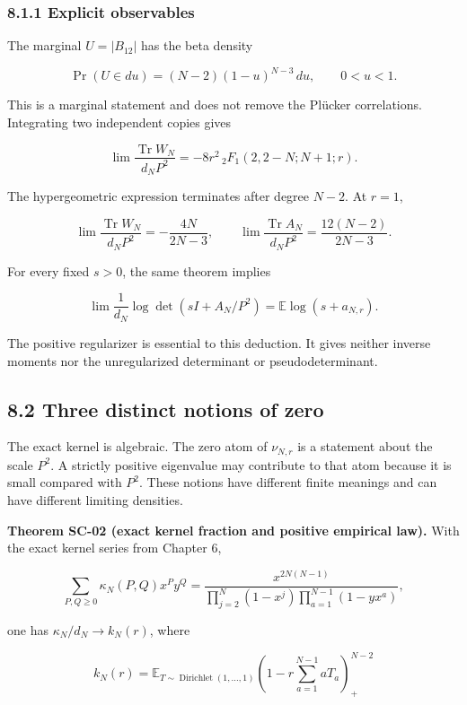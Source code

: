\documentclass[a4paper,11pt]{article}
\numberwithin{equation}{section}
\begin{document}
\hypertarget{explicit-observables}{%
\subsubsection{8.1.1 Explicit observables}\label{explicit-observables}}

The marginal \(U=|B_{12}|\) has the beta density

\[
\Pr(U\in du)=(N-2)(1-u)^{N-3}\,du,\qquad0<u<1.
\]

This is a marginal statement and does not remove the Plücker correlations. Integrating two independent copies gives

\[
\lim\frac{\operatorname{Tr}W_N}{d_NP^2}
=-8r^2\,{}_2F_1(2,2-N;N+1;r).
\]

The hypergeometric expression terminates after degree \(N-2\). At \(r=1\),

\[
\lim\frac{\operatorname{Tr}W_N}{d_NP^2}=-\frac{4N}{2N-3},\qquad
\lim\frac{\operatorname{Tr}A_N}{d_NP^2}=\frac{12(N-2)}{2N-3}.
\]

For every fixed \(s>0\), the same theorem implies

\[
\lim\frac1{d_N}\log\det(sI+A_N/P^2)
=\mathbb E\log(s+a_{N,r}).
\]

The positive regularizer is essential to this deduction. It gives neither inverse moments nor the unregularized determinant or pseudodeterminant.

\hypertarget{three-distinct-notions-of-zero}{%
\subsection{8.2 Three distinct notions of zero}\label{three-distinct-notions-of-zero}}

The exact kernel is algebraic. The zero atom of \(\nu_{N,r}\) is a statement about the scale \(P^2\). A strictly positive eigenvalue may contribute to that atom because it is small compared with \(P^2\). These notions have different finite meanings and can have different limiting densities.

\textbf{Theorem SC-02 (exact kernel fraction and positive empirical law).} With the exact kernel series from Chapter 6,

\[
\sum_{P,Q\geq0}\kappa_N(P,Q)x^Py^Q
=\frac{x^{2N(N-1)}}{
\prod_{j=2}^N(1-x^j)\prod_{a=1}^{N-1}(1-yx^a)},
\]

one has \(\kappa_N/d_N\to k_N(r)\), where

\[
k_N(r)=\mathbb E_{T\sim\operatorname{Dirichlet}(1,\ldots,1)}
\left(1-r\sum_{a=1}^{N-1}aT_a\right)_+^{N-2}
\]
\end{document}
